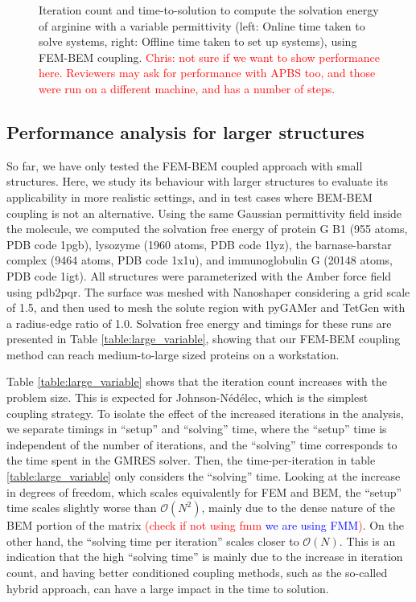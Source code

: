 \begin{figure}
\caption{Iteration count and time-to-solution to compute the solvation energy of arginine with a variable permittivity (left: Online time taken to solve systems, right: Offline time taken to set up systems), using FEM-BEM coupling. %
\textcolor{red}{Chris: not sure if we want to show performance here. Reviewers may ask for performance with APBS too, and those were run on a different machine, and has a number of steps.}}
\label{fig:arg2_variable}
\end{figure}


\subsection*{\sffamily \large Performance analysis for larger structures}

So far, we have only tested the FEM-BEM coupled approach with small structures. Here, we study its behaviour with larger structures to evaluate its applicability in more realistic settings, and  in test cases where BEM-BEM coupling is not an alternative. Using the same Gaussian permittivity field inside the molecule, we computed the solvation free energy of protein G B1 (955 atoms, PDB code 1pgb), lysozyme (1960 atoms, PDB code 1lyz), the barnase-barstar complex (9464 atoms, PDB code 1x1u), and immunoglobulin G (20148 atoms, PDB code 1igt). All structures were parameterized with the Amber\cite{Swanson05} force field using pdb2pqr.\cite{Dolinsky04} The surface was meshed with Nanoshaper\cite{decherchi2013general} considering a grid scale of 1.5, and then used to mesh the solute region with pyGAMer\cite{lee2020open} and TetGen\cite{hang2015tetgen} with a radius-edge ratio of 1.0. Solvation free energy and timings for these runs are presented in Table \ref{table:large_variable}, showing that our FEM-BEM coupling method can reach medium-to-large sized proteins on a workstation. 

Table \ref{table:large_variable} shows that the iteration count increases with the problem size. This is expected for Johnson-N\'ed\'elec, which is the simplest coupling strategy. To isolate the effect of the increased iterations in the analysis, we separate timings in ``setup'' and ``solving'' time, where the ``setup'' time is independent of the number of iterations, and the ``solving'' time corresponds to the time spent in the GMRES solver. Then, the time-per-iteration in table \ref{table:large_variable} only considers the ``solving'' time. Looking at the increase in degrees of freedom, which scales equivalently for FEM and BEM, the ``setup'' time scales slightly worse than $\mathcal{O}(N^2)$, mainly due to the dense nature of the BEM portion of the matrix \textcolor{red}{(check if not using fmm  \textcolor{blue}{we are using FMM})}. On the other hand, the ``solving time per iteration'' scales closer to $\mathcal{O}(N)$. This is an indication that the high ``solving time'' is mainly due to the increase in iteration count, and having better conditioned coupling methods, such as the so-called hybrid approach,\cite{betcke2022hybrid} can have a large impact in the time to solution.


